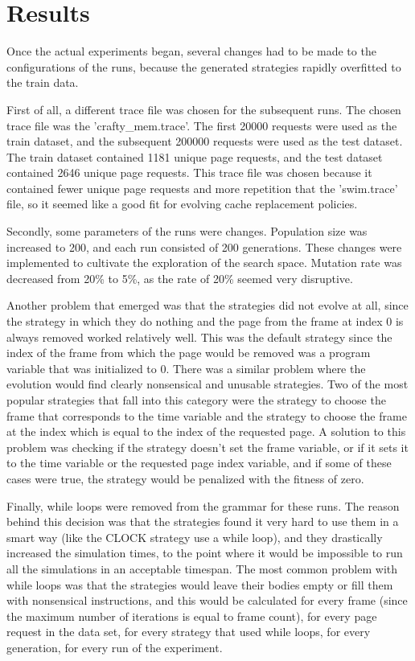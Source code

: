 \section{Results}
Once the actual experiments began, several changes had to be made to the configurations of the runs, because the generated strategies rapidly overfitted to the train data.

First of all, a different trace file was chosen for the subsequent runs. The chosen trace file was the 'crafty\_mem.trace'. The first 20000 requests were used as the train dataset, and the subsequent 200000 requests were used as the test dataset. The train dataset contained 1181 unique page requests, and the test dataset contained 2646 unique page requests. This trace file was chosen because it contained fewer unique page requests and more repetition that the 'swim.trace' file, so it seemed like a good fit for evolving cache replacement policies.

Secondly, some parameters of the runs were changes. Population size was increased to 200, and each run consisted of 200 generations. These changes were implemented to cultivate the exploration of the search space. Mutation rate was decreased from 20\% to 5\%, as the rate of 20\% seemed very disruptive.

Another problem that emerged was that the strategies did not evolve at all, since the strategy in which they do nothing and the page from the frame at index 0 is always removed worked relatively well. This was the default strategy since the index of the frame from which the page would be removed was a program variable that was initialized to 0. There was a similar problem where the evolution would find clearly nonsensical and unusable strategies. Two of the most popular strategies that fall into this category were the strategy to choose the frame that corresponds to the time variable and the strategy to choose the frame at the index which is equal to the index of the requested page. A solution to this problem was checking if the strategy doesn't set the frame variable, or if it sets it to the time variable or the requested page index variable, and if some of these cases were true, the strategy would be penalized with the fitness of zero.

Finally, while loops were removed from the grammar for these runs. The reason behind this decision was that the strategies found it very hard to use them in a smart way (like the CLOCK strategy use a while loop), and they drastically increased the simulation times, to the point where it would be impossible to run all the simulations in an acceptable timespan. The most common problem with while loops was that the strategies would leave their bodies empty or fill them with nonsensical instructions, and this would be calculated for every frame (since the maximum number of iterations is equal to frame count), for every page request in the data set, for every strategy that used while loops, for every generation, for every run of the experiment.


